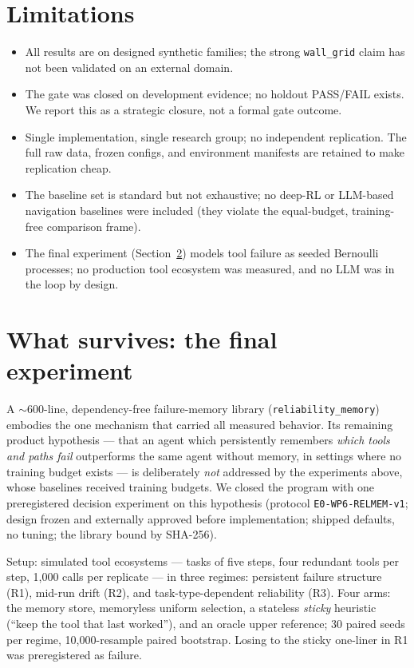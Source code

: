 \documentclass[11pt]{article}
\begin{document}
\section{Limitations}

\begin{itemize}
  \item All results are on designed synthetic families; the strong
    \texttt{wall\_grid} claim has not been validated on an external domain.
  \item The gate was closed on development evidence; no holdout PASS/FAIL
    exists. We report this as a strategic closure, not a formal gate
    outcome.
  \item Single implementation, single research group; no independent
    replication. The full raw data, frozen configs, and environment
    manifests are retained to make replication cheap.
  \item The baseline set is standard but not exhaustive; no deep-RL or
    LLM-based navigation baselines were included (they violate the
    equal-budget, training-free comparison frame).
  \item The final experiment (Section~\ref{sec:survives}) models tool
    failure as seeded Bernoulli processes; no production tool ecosystem was
    measured, and no LLM was in the loop by design.
\end{itemize}

\section{What survives: the final experiment}\label{sec:survives}

A ${\sim}600$-line, dependency-free failure-memory library
(\texttt{reliability\_memory}) embodies the one mechanism that carried all
measured behavior. Its remaining product hypothesis --- that an agent which
persistently remembers \emph{which tools and paths fail} outperforms the
same agent without memory, in settings where no training budget exists ---
is deliberately \emph{not} addressed by the experiments above, whose
baselines received training budgets. We closed the program with one
preregistered decision experiment on this hypothesis (protocol
\texttt{E0-WP6-RELMEM-v1}; design frozen and externally approved before
implementation; shipped defaults, no tuning; the library bound by SHA-256).

Setup: simulated tool ecosystems --- tasks of five steps, four redundant
tools per step, 1{,}000 calls per replicate --- in three regimes: persistent
failure structure (R1), mid-run drift (R2), and task-type-dependent
reliability (R3). Four arms: the memory store, memoryless uniform selection,
a stateless \emph{sticky} heuristic (``keep the tool that last worked''),
and an oracle upper reference; 30 paired seeds per regime,
10{,}000-resample paired bootstrap. Losing to the sticky one-liner in R1 was
preregistered as failure.
\end{document}
